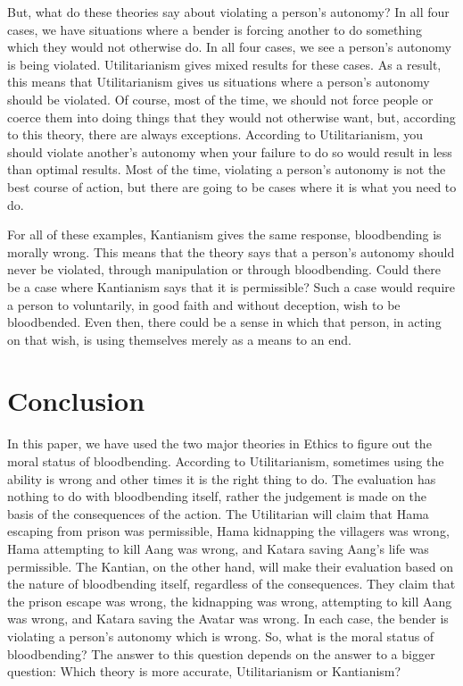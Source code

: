 But, what do these theories say about violating a person’s autonomy? In all four cases, we have situations where a bender is forcing another to do something which they would not otherwise do. In all four cases, we see a person’s autonomy is being violated. Utilitarianism gives mixed results for these cases. As a result, this means that Utilitarianism gives us situations where a person’s autonomy should be violated. Of course, most of the time, we should not force people or coerce them into doing things that they would not otherwise want, but, according to this theory, there are always exceptions. According to Utilitarianism, you should violate another’s autonomy when your failure to do so would result in less than optimal results. Most of the time, violating a person’s autonomy is not the best course of action, but there are going to be cases where it is what you need to do.   

For all of these examples, Kantianism gives the same response, bloodbending is morally wrong. This means that the theory says that a person’s autonomy should never be violated, through manipulation or through bloodbending. Could there be a case where Kantianism says that it is permissible? Such a case would require a person to voluntarily, in good faith and without deception, wish to be bloodbended. Even then, there could be a sense in which that person, in acting on that wish, is using themselves merely as a means to an end.
\section{Conclusion}

In this paper, we have used the two major theories in Ethics to figure out the moral status of bloodbending. According to Utilitarianism, sometimes using the ability is wrong and other times it is the right thing to do. The evaluation has nothing to do with bloodbending itself, rather the judgement is made on the basis of the consequences of the action. The Utilitarian will claim that Hama escaping from prison was permissible, Hama kidnapping the villagers was wrong, Hama attempting to kill Aang was wrong, and Katara saving Aang’s life was permissible. The Kantian, on the other hand, will make their evaluation based on the nature of bloodbending itself, regardless of the consequences. They claim that the prison escape was wrong, the kidnapping was wrong, attempting to kill Aang was wrong, and Katara saving the Avatar was wrong. In each case, the bender is violating a person’s autonomy which is wrong.  So, what is the moral status of bloodbending? The answer to this question depends on the answer to a bigger question: Which theory is more accurate, Utilitarianism or Kantianism?

\setcounter{footnote}{\thefd}